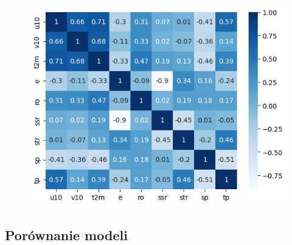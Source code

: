 \begin{figure}[H]
    \centering
    \includegraphics[width=\textwidth]{images/dt_corr_matrix.png}
    \caption{}
    \label{dt-corr-matrix}
\end{figure}



\subsection{Porównanie modeli}

